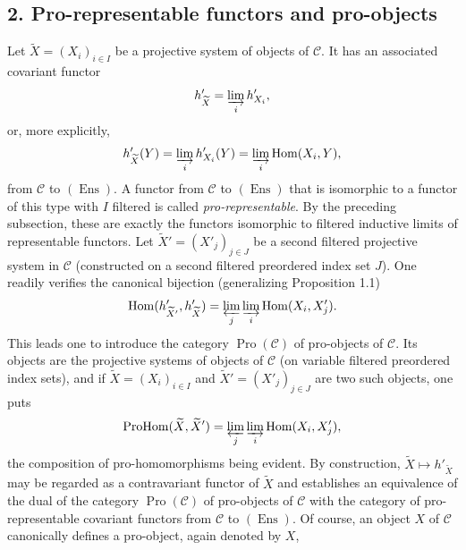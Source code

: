 \subsection*{2. Pro-representable functors and pro-objects}

Let $\widetilde X=(X_i)_{i\in I}$ be a projective system of objects of
$\mathcal C$. It has an associated covariant functor
\[
  h'_{\widetilde X}=\varinjlim_i h'_{X_i},
\]
or, more explicitly,
\[
  h'_{\widetilde X}(Y)=\varinjlim_i h'_{X_i}(Y)
  =\varinjlim_i\operatorname{Hom}(X_i,Y),
\]
from $\mathcal C$ to $(\operatorname{Ens})$. A functor from $\mathcal C$ to
$(\operatorname{Ens})$ that is isomorphic to a functor of this type with $I$
filtered is called \emph{pro-representable}. By the preceding subsection,
these are exactly the functors isomorphic to filtered inductive limits of
representable functors. Let
$\widetilde X'=(X'_j)_{j\in J}$ be a second filtered projective system in
$\mathcal C$ (constructed on a second filtered preordered index set $J$). One
readily verifies the canonical bijection (generalizing Proposition 1.1)
\[
  \operatorname{Hom}(h'_{\widetilde X'},h'_{\widetilde X})
  =\varprojlim_j\varinjlim_i\operatorname{Hom}(X_i,X'_j).
\]
This leads one to introduce the category $\operatorname{Pro}(\mathcal C)$ of
pro-objects of $\mathcal C$. Its objects are the projective systems of objects
of $\mathcal C$ (on variable filtered preordered index sets), and if
$\widetilde X=(X_i)_{i\in I}$ and
$\widetilde X'=(X'_j)_{j\in J}$ are two such objects, one puts
\[
  \operatorname{ProHom}(\widetilde X,\widetilde X')
  =\varprojlim_j\varinjlim_i\operatorname{Hom}(X_i,X'_j),
\]
the composition of pro-homomorphisms being evident. By construction,
$\widetilde X\longmapsto h'_{\widetilde X}$ may be regarded as a contravariant
functor of $\widetilde X$ and establishes an equivalence of the dual of the
category $\operatorname{Pro}(\mathcal C)$ of pro-objects of $\mathcal C$ with
the category of pro-representable covariant functors from $\mathcal C$ to
$(\operatorname{Ens})$. Of course, an object $X$ of $\mathcal C$ canonically
defines a pro-object, again denoted by $X$,

